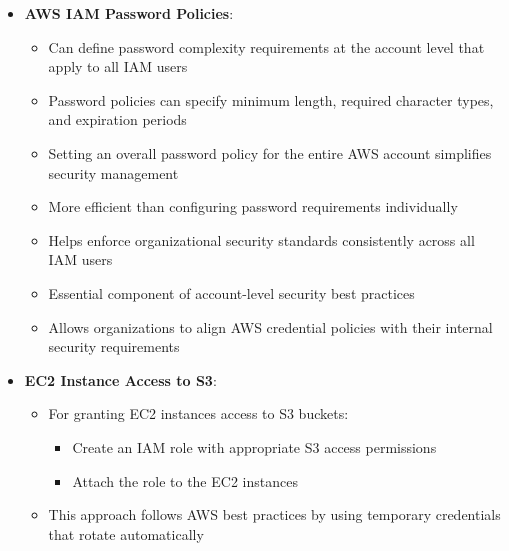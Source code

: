 \documentclass[11pt,a4paper]{report}
\begin{document}
\begin{itemize}
\begin{itemize}
  \item IAM policies can use IP address conditions to restrict access:
\begin{itemize}
  \item Use NotIpAddress condition with aws:SourceIp to deny actions from unauthorized IP ranges
\end{itemize}
  \item Will deny actions (like EC2 termination) when requests originate from IP addresses outside specified ranges
  \item Particularly useful for administrative actions that should only be performed from secure networks
  \item Enforces security at the API action level rather than just network level
\end{itemize}
  \item \textbf{AWS IAM Password Policies}:
\begin{itemize}
  \item Can define password complexity requirements at the account level that apply to all IAM users
  \item Password policies can specify minimum length, required character types, and expiration periods
  \item Setting an overall password policy for the entire AWS account simplifies security management
  \item More efficient than configuring password requirements individually
  \item Helps enforce organizational security standards consistently across all IAM users
  \item Essential component of account-level security best practices
  \item Allows organizations to align AWS credential policies with their internal security requirements
\end{itemize}
  \item \textbf{EC2 Instance Access to S3}:
\begin{itemize}
  \item For granting EC2 instances access to S3 buckets:
\begin{itemize}
  \item Create an IAM role with appropriate S3 access permissions
  \item Attach the role to the EC2 instances
\end{itemize}
  \item This approach follows AWS best practices by using temporary credentials that rotate automatically

\end{itemize}
\end{itemize}
\end{document}
